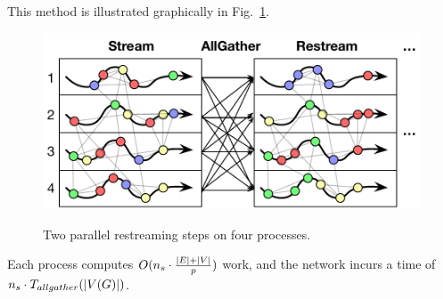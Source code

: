 This method is illustrated graphically in Fig.~\ref{fig:restream}.

\begin{figure}[ht]
\centering
  \includegraphics[width=1.0\columnwidth]{figures/restreamdiagram.pdf}
  \label{fig:restream}
  \caption{Two parallel restreaming steps on four processes.}
\end{figure}

Each process computes $O(n_s \cdot \frac{|E|+|V|}{p})$ work, and the network incurs a time of $n_s \cdot T_{allgather}(|V(G)|)$. 
